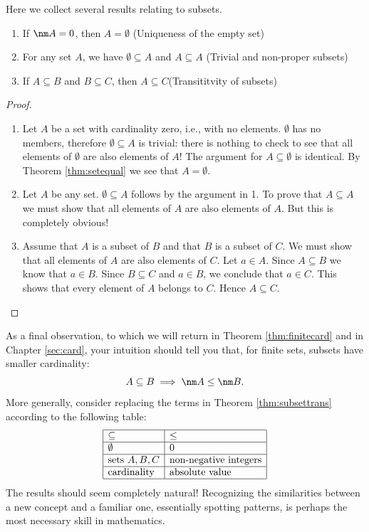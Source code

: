Here we collect several results relating to subsets.

\begin{thm}\label{thm:subsettrans}\hypertarget{thm:subsettranslnk}{}
\begin{enumerate}
  \item If $\nm A=0$, then $A=\emptyset$ \hfill (Uniqueness of the empty set)
  \item For any set $A$, we have $\emptyset\subseteq A$ and $A\subseteq A$ \hfill (Trivial and non-proper subsets)
  \item If $A\subseteq B$ and $B\subseteq C$, then $A\subseteq C$\hfill(Transititvity of subsets)
\end{enumerate}%
\end{thm}

\begin{proof}
\begin{enumerate}
  \item Let $A$ be a set with cardinality zero, i.e., with no elements. $\emptyset$ has no members, therefore $\emptyset\subseteq A$ is trivial: there is nothing to check to see that all elements of $\emptyset$ are also elements of $A$! The argument for $A\subseteq\emptyset$ is identical. By Theorem \ref{thm:setequal} we see that $A=\emptyset$.
  \item Let $A$ be any set. $\emptyset\subseteq A$ follows by the argument in 1. To prove that $A\subseteq A$ we must show that all elements of $A$ are also elements of $A$. But this is completely obvious!
  \item Assume that $A$ is a subset of $B$ and that $B$ is a subset of $C$. We must show that all elements of $A$ are also elements of $C$. Let $a\in A$. Since $A\subseteq B$ we know that $a\in B$. Since $B\subseteq C$ and $a\in B$, we conclude that $a\in C$. This shows that every element of $A$ belongs to $C$. Hence $A\subseteq C$.\qedhere
\end{enumerate}
\end{proof}

As a final observation, to which we will return in Theorem \ref{thm:finitecard} and in Chapter \ref{sec:card}, your intuition should tell you that, for finite sets, subsets have smaller cardinality:
\[A\subseteq B\implies\nm A\le\nm B.\]
More generally, consider replacing the terms in Theorem \hyperlink{thm:subsettranslnk}{\ref*{thm:subsettrans}} according to the following table:
\[\begin{array}{|l|l|}\hline
\subseteq&\le\\\hline
\emptyset&0\\\hline
\text{sets }A,B,C&\text{non-negative integers}\\\hline
\text{cardinality}&\text{absolute value}\\\hline
\end{array}\]
The results should seem completely natural! Recognizing the similarities between a new concept and a familiar one, essentially spotting patterns, is perhaps the most necessary skill in mathematics.


